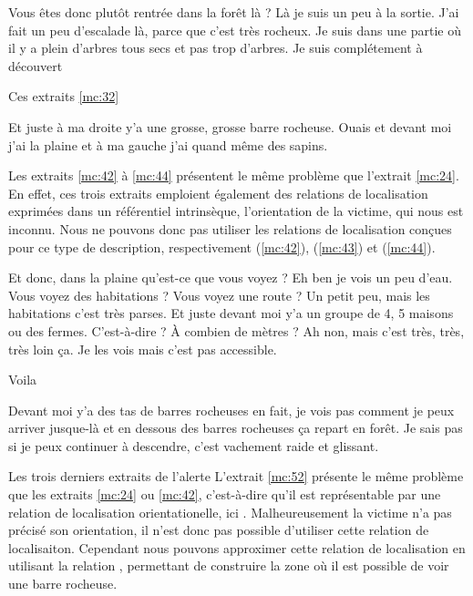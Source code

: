 \begin{dialogue*}
  \Sec {} Vous êtes donc plutôt rentrée dans la forêt là ?
  \Req {} Là je suis un peu à la
  sortie.  J’ai fait un peu d’escalade là,
   parce que c’est très rocheux.  Je
  suis dans une partie où il y a plein d’arbres tous secs et pas trop
  d’arbres. Je suis complétement à découvert
\end{dialogue*}
% 
Ces extraits \ref{mc:32}


\begin{dialogue*}
  \Req {} Et juste à ma droite y’a une grosse, grosse
  barre rocheuse.  Ouais et devant moi j’ai la plaine
  et  à ma gauche j’ai quand même des sapins.
\end{dialogue*}
% 
Les extraits \ref{mc:42} à \ref{mc:44} présentent le même problème que
l'extrait \ref{mc:24}. En effet, ces trois extraits emploient
également des relations de localisation exprimées dans un référentiel
intrinsèque, l'orientation de la victime, qui nous est inconnu. Nous
ne pouvons donc pas utiliser les relations de localisation conçues
pour ce type de description, respectivement
 (\ref{mc:42}),
 (\ref{mc:43}) et
 (\ref{mc:44}).


\begin{dialogue*}
  \Sec {} Et donc, dans la plaine qu’est-ce que vous
  voyez ?
  \Req {} Eh ben je vois un peu d’eau.
  \Sec {} Vous voyez des habitations ? Vous voyez une
  route ?
  \Req {} Un petit peu, mais les habitations c’est très
  parses.  Et juste devant moi y’a un groupe de 4, 5
  maisons ou des fermes.
  \Sec {} C’est-à-dire ? À combien de mètres ?
  \Req {} Ah non, mais c’est très, très, très loin
  ça. Je les vois mais c’est pas accessible.
\end{dialogue*}
% 
Voila


\begin{dialogue*}
  \Req {} Devant moi y’a des tas de barres rocheuses en
  fait, je vois pas comment je peux arriver jusque-là et
   en dessous des barres rocheuses ça repart en
  forêt.  Je sais pas si je peux continuer à
  descendre, c’est vachement raide et glissant.
\end{dialogue*}
% 
Les trois derniers extraits de l'alerte
%
L'extrait \ref{mc:52} présente le même problème que les extraits
\ref{mc:24} ou \ref{mc:42}, c'est-à-dire qu'il est représentable par
une relation de localisation orientationelle, ici
. Malheureusement la victime n'a pas
précisé son orientation, il n'est donc pas possible d'utiliser cette
relation de localisaiton. Cependant nous pouvons approximer cette
relation de localisation en utilisant la relation
, permettant de construire la zone où il
est possible de voir une barre rocheuse.



